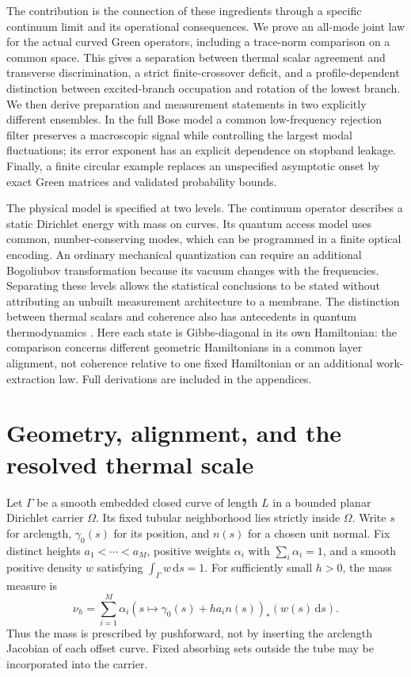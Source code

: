 \documentclass[aps,pra,reprint,superscriptaddress,longbibliography]{revtex4-2}
\newcommand{\dd}{\mathrm d}
\begin{document}
The contribution is the connection of these ingredients through a
specific continuum limit and its operational consequences. We prove an
all-mode joint law for the actual curved Green operators, including a
trace-norm comparison on a common space. This gives a separation between
thermal scalar agreement and transverse discrimination, a strict
finite-crossover deficit, and a profile-dependent distinction between
excited-branch occupation and rotation of the lowest branch. We then
derive preparation and measurement statements in two explicitly
different ensembles. In the full Bose model a common low-frequency
rejection filter preserves a macroscopic signal while controlling the
largest modal fluctuations; its error exponent has an explicit dependence
on stopband leakage. Finally, a finite circular example replaces an
unspecified asymptotic onset by exact Green matrices and validated
probability bounds.

The physical model is specified at two levels. The continuum operator
describes a static Dirichlet energy with mass on curves. Its quantum
access model uses common, number-conserving modes, which can be programmed
in a finite optical encoding. An ordinary mechanical quantization can
require an additional Bogoliubov transformation because its vacuum
changes with the frequencies. Separating these levels allows the
statistical conclusions to be stated without attributing an unbuilt
measurement architecture to a membrane. The distinction between thermal
scalars and coherence also has antecedents in quantum thermodynamics
\cite{Lostaglio2015}. Here each state is Gibbs-diagonal in its own
Hamiltonian: the comparison concerns different geometric Hamiltonians
in a common layer alignment, not coherence relative to one fixed
Hamiltonian or an additional work-extraction law. Full derivations are included
in the appendices.

\section{Geometry, alignment, and the resolved thermal scale}
\label{sgt:main:model}

Let $\Gamma$ be a smooth embedded closed curve of length $L$ in a bounded
planar Dirichlet carrier $\Omega$. Its fixed tubular neighborhood lies
strictly inside $\Omega$. Write $s$ for arclength, $\gamma_0(s)$ for its
position, and $n(s)$ for a chosen unit normal. Fix distinct heights
$a_1<\cdots<a_M$, positive weights $\alpha_i$ with
$\sum_i\alpha_i=1$, and a smooth positive density $w$ satisfying
$\int_\Gamma w\,\dd s=1$. For sufficiently small $h>0$, the mass measure is
\begin{equation}
 \nu_h=\sum_{i=1}^M\alpha_i
       (s\mapsto\gamma_0(s)+ha_i n(s))_*(w(s)\,\dd s).
 \label{sgt:main:measure}
\end{equation}
Thus the mass is prescribed by pushforward, not by inserting the
arclength Jacobian of each offset curve. Fixed absorbing sets outside
the tube may be incorporated into the carrier.
\end{document}
